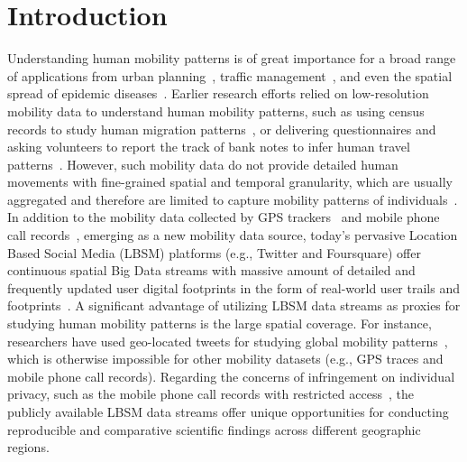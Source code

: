\documentclass[ijgi,article,accept,moreauthors,pdftex,10pt,a4paper]{mdpi}
\theoremstyle{mdpi}
\newcounter{ex}
\newcounter{re}
\theoremstyle{mdpidefinition}
\begin{document}


\section{Introduction}
Understanding human mobility patterns is of great importance for a broad range of applications from urban planning~\cite{zheng2008understanding}, traffic management~\cite{jiang2009characterizing}, and even the spatial spread of epidemic diseases~\cite{belik2011natural}.
Earlier research efforts relied on low-resolution mobility data to understand human mobility patterns, such as using census records to study human migration patterns~\cite{greenwood1985human}, or delivering questionnaires and asking volunteers to report the track of bank notes to infer human travel patterns~\cite{brockmann2006scaling}.
However, such mobility data do not provide detailed human movements with fine-grained spatial and temporal granularity, which are usually aggregated and therefore are limited to capture mobility patterns of individuals~\cite{gonzalez2008understanding,Jurdak2015}.
In addition to the mobility data collected by GPS trackers~\cite{zheng2008understanding, rhee2011levy} and mobile phone call records~\cite{gonzalez2008understanding,sevtsuk2010does,kung2014exploring}, emerging as a new mobility data source, today's pervasive Location Based Social Media (LBSM) platforms (e.g., Twitter and Foursquare) offer continuous spatial Big Data streams with massive amount of detailed and frequently updated user digital footprints in the form of real-world user trails and footprints~\cite{thatcher2014living}.
A significant advantage of utilizing LBSM data streams as proxies for studying human mobility patterns is the large spatial coverage.
For instance, researchers have used geo-located tweets for studying global mobility patterns~\cite{hawelka2014geo}, which is otherwise impossible for other mobility datasets (e.g., GPS traces and mobile phone call records).
Regarding the concerns of infringement on individual privacy, such as the mobile phone call records with restricted access~\cite{giannotti2008mobility,crampton2014collect,Jurdak2015}, the publicly available LBSM data streams offer unique opportunities for conducting reproducible and comparative scientific findings across different geographic regions.
\end{document}
